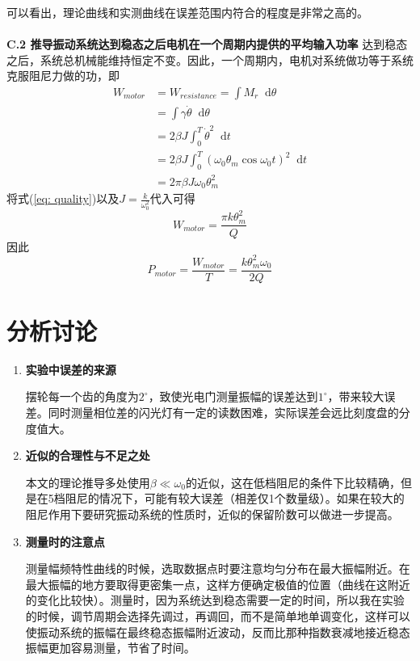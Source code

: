 \documentclass[a4paper,11pt]{article}
\newcommand*{\dif}{\mathop{}\!\mathrm{d}}
\begin{document}
        可以看出，理论曲线和实测曲线在误差范围内符合的程度是非常之高的。
        ~\\~\\
        \textbf{C.2 推导振动系统达到稳态之后电机在一个周期内提供的平均输入功率}
            达到稳态之后，系统总机械能维持恒定不变。因此，一个周期内，电机对系统做功等于系统克服阻尼力做的功，即
            \begin{align}
                W_{motor} & = W_{resistance} = \int M_r \dif \theta \\
                &= \int \gamma\dot{\theta}\dif\theta \\
                &= 2\beta J\int_0^T \dot{\theta}^2\dif t \\
                &= 2\beta J\int_0^T (\omega_0\theta_m\cos\omega_0t)^2\dif t \\
                &= 2\pi\beta J\omega_0\theta_m^2
            \end{align}
            将式(\ref{eq: quality})以及$J=\frac k{\omega_0^2}$代入可得
            \begin{equation}
                W_{motor} = \frac{\pi k\theta_m^2}{Q}
            \end{equation}
            因此
            \begin{equation}
                P_{motor} = \frac{W_{motor}}{T} = \frac{k\theta_m^2\omega_0}{2Q}
            \end{equation}
    \section{分析讨论}
        \begin{enumerate}
            \item \textbf{实验中误差的来源}

                摆轮每一个齿的角度为$2^\circ$，致使光电门测量振幅的误差达到$1^\circ$，带来较大误差。同时测量相位差的闪光灯有一定的读数困难，实际误差会远比刻度盘的分度值大。
                
            \item \textbf{近似的合理性与不足之处}
            
                本文的理论推导多处使用$\beta \ll \omega_0$的近似，这在低档阻尼的条件下比较精确，但是在5档阻尼的情况下，可能有较大误差（相差仅1个数量级）。如果在较大的阻尼作用下要研究振动系统的性质时，近似的保留阶数可以做进一步提高。

            \item \textbf{测量时的注意点}
            
                测量幅频特性曲线的时候，选取数据点时要注意均匀分布在最大振幅附近。在最大振幅的地方要取得更密集一点，这样方便确定极值的位置（曲线在这附近的变化比较快）。测量时，因为系统达到稳态需要一定的时间，所以我在实验的时候，调节周期会选择先调过，再调回，而不是简单地单调变化，这样可以使振动系统的振幅在最终稳态振幅附近波动，反而比那种指数衰减地接近稳态振幅更加容易测量，节省了时间。

        \end{enumerate}
\end{document}
